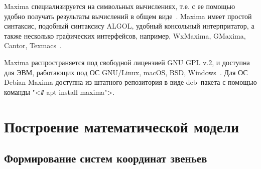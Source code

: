\documentclass[oneside, final, 14pt]{extarticle}
\begin{document}
\par
Maxima специализируется на символьных вычислениях, т.е. с ее помощью удобно получать результаты вычислений в общем виде~\cite{site:maxima}.
Maxima имеет простой синтаксис, подобный синтаксису ALGOL, удобный консольный интерпритатор, а также несколько графических интерфейсов, например, WxMaxima, GMaxima, Cantor, Texmacs~\cite{site:maxima}.
\par
Maxima распространяется под свободной лицензией GNU GPL v.2, и доступна для ЭВМ, работающих под ОС GNU/Linux, macOS, BSD, Windows~\cite{site:maxima}.
Для ОС Debian Maxima доступна из штатного репозитория в виде deb--пакета с помощью команды "<{\ttfamily \verb|#| apt install maxima}">.


\newpage

\section{Построение математической модели}

\subsection{Формирование систем координат звеньев}
\end{document}
